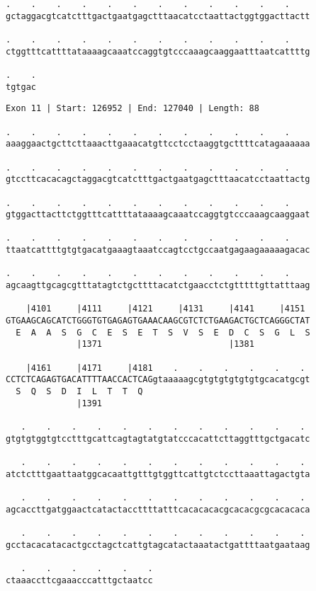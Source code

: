 \documentclass{article}
\begin{document}
\newpage
\begin{Verbatim}[fontfamily=courier]
.    .    .    .    .    .    .    .    .    .    .    .    
gctaggacgtcatctttgactgaatgagctttaacatcctaattactggtggacttactt

.    .    .    .    .    .    .    .    .    .    .    .    
ctggtttcattttataaaagcaaatccaggtgtcccaaagcaaggaatttaatcattttg

.    .
tgtgac
\end{Verbatim}
\newpage
\begin{Verbatim}[fontfamily=courier]
Exon 11 | Start: 126952 | End: 127040 | Length: 88

.    .    .    .    .    .    .    .    .    .    .    .    
aaaggaactgcttcttaaacttgaaacatgttcctcctaaggtgcttttcatagaaaaaa

.    .    .    .    .    .    .    .    .    .    .    .    
gtccttcacacagctaggacgtcatctttgactgaatgagctttaacatcctaattactg

.    .    .    .    .    .    .    .    .    .    .    .    
gtggacttacttctggtttcattttataaaagcaaatccaggtgtcccaaagcaaggaat

.    .    .    .    .    .    .    .    .    .    .    .    
ttaatcattttgtgtgacatgaaagtaaatccagtcctgccaatgagaagaaaaagacac

.    .    .    .    .    .    .    .    .    .    .    .    
agcaagttgcagcgtttatagtctgcttttacatctgaacctctgtttttgttatttaag

    |4101     |4111     |4121     |4131     |4141     |4151 
GTGAAGCAGCATCTGGGTGTGAGAGTGAAACAAGCGTCTCTGAAGACTGCTCAGGGCTAT
  E  A  A  S  G  C  E  S  E  T  S  V  S  E  D  C  S  G  L  S
              |1371                         |1381           

    |4161     |4171     |4181    .    .    .    .    .    . 
CCTCTCAGAGTGACATTTTAACCACTCAGgtaaaaagcgtgtgtgtgtgtgcacatgcgt
  S  Q  S  D  I  L  T  T  Q                                 
              |1391                                         

   .    .    .    .    .    .    .    .    .    .    .    . 
gtgtgtggtgtcctttgcattcagtagtatgtatcccacattcttaggtttgctgacatc

   .    .    .    .    .    .    .    .    .    .    .    . 
atctctttgaattaatggcacaattgtttgtggttcattgtctccttaaattagactgta

   .    .    .    .    .    .    .    .    .    .    .    . 
agcaccttgatggaactcatactaccttttatttcacacacacgcacacgcgcacacaca

   .    .    .    .    .    .    .    .    .    .    .    . 
gcctacacatacactgcctagctcattgtagcatactaaatactgattttaatgaataag

   .    .    .    .    .    .
ctaaaccttcgaaacccatttgctaatcc
\end{Verbatim}
\end{document}
